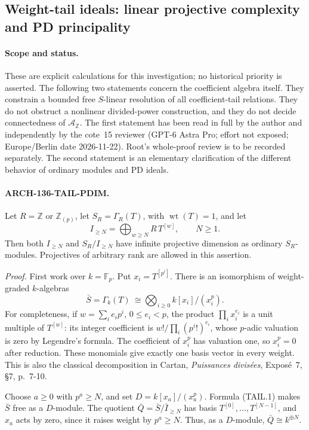 \subsection{Weight-tail ideals: linear projective complexity and PD principality}
\label{arch136:tail-pdim}

\paragraph{Scope and status.}
These are explicit calculations for this investigation; no historical
priority is asserted.
The following two statements concern the coefficient algebra itself.
They constrain a bounded free \(S\)-linear resolution of all coefficient-tail
relations. They do not obstruct a nonlinear divided-power construction, and
they do not decide connectedness of \(\mathcal A_{\mathbb Z}\).
The first statement has been read in full by the author and independently
by the cote~15 reviewer (GPT-6 Astra Pro; effort not exposed;
Europe/Berlin date 2026-11-22). Root's whole-proof review is to be recorded
separately. The second statement is an elementary clarification of the
different behavior of ordinary modules and PD ideals.

\paragraph{ARCH-136-TAIL-PDIM.}
Let \(R=\mathbb Z\) or \(\mathbb Z_{(p)}\), let
\(S_R=\Gamma_R(T)\), with \(\operatorname{wt}(T)=1\), and let
\[
 I_{\ge N}=\bigoplus_{w\ge N}R\,T^{[w]},\qquad N\ge1.
\]
Then both \(I_{\ge N}\) and \(S_R/I_{\ge N}\) have infinite projective
dimension as ordinary \(S_R\)-modules. Projectives of arbitrary rank
are allowed in this assertion.

\emph{Proof.}
First work over \(k=\mathbb F_p\). Put \(x_i=T^{[p^i]}\). There is an
isomorphism of weight-graded \(k\)-algebras
\[
 \bar S=\Gamma_k(T)\ \cong
 \bigotimes_{i\ge0}k[x_i]/(x_i^p).
 \tag{TAIL.1}
\]
For completeness, if \(w=\sum_i e_i p^i\), \(0\le e_i<p\), the product
\(\prod_i x_i^{e_i}\) is a unit multiple of \(T^{[w]}\): its integer
coefficient is \(w!/\prod_i(p^i!)^{e_i}\), whose \(p\)-adic valuation is
zero by Legendre's formula. The coefficient of \(x_i^p\) has valuation
one, so \(x_i^p=0\) after reduction. These monomials give exactly one
basis vector in every weight. This is also the classical decomposition
in Cartan, \emph{Puissances divis\'ees}, Expos\'e~7, \S7, p.~7-10.

Choose \(a\ge0\) with \(p^a\ge N\), and set
\(D=k[x_a]/(x_a^p)\). Formula (TAIL.1) makes \(\bar S\) free as a
\(D\)-module. The quotient
\(\bar Q=\bar S/\bar I_{\ge N}\) has basis
\(T^{[0]},\ldots,T^{[N-1]}\), and \(x_a\) acts by zero, since it raises
weight by \(p^a\ge N\). Thus, as a \(D\)-module,
\(\bar Q\cong k^{\oplus N}\).

